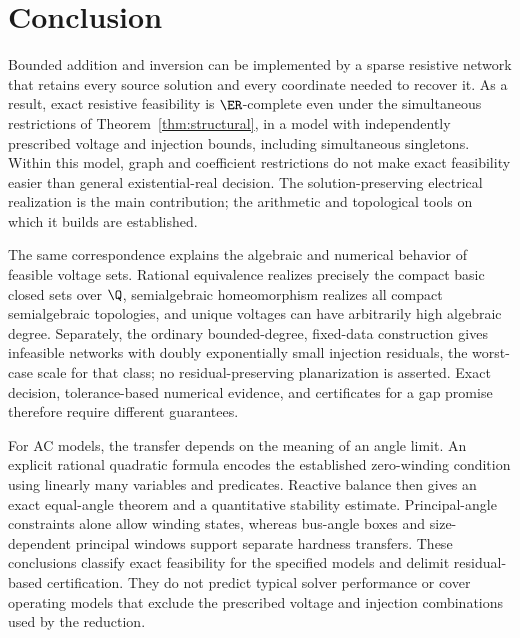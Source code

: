 \section{Conclusion}
\label{sec:conclusion}

Bounded addition and inversion can be implemented by a sparse resistive
network that retains every source solution and every coordinate needed to
recover it. As a result, exact resistive feasibility is $\ER$-complete even
under the simultaneous restrictions of Theorem~\ref{thm:structural}, in a
model with independently prescribed voltage and injection bounds, including
simultaneous singletons. Within this model, graph and coefficient
restrictions do not make exact feasibility easier than general
existential-real decision. The solution-preserving electrical realization
is the main contribution; the arithmetic and topological tools on which it
builds are established.

The same correspondence explains the algebraic and numerical behavior of
feasible voltage sets. Rational equivalence realizes precisely the compact
basic closed sets over $\Q$, semialgebraic homeomorphism realizes all
compact semialgebraic topologies, and unique voltages can have arbitrarily
high algebraic degree. Separately, the ordinary bounded-degree, fixed-data
construction gives infeasible networks with doubly exponentially small
injection residuals, the worst-case scale for that class; no
residual-preserving planarization is asserted. Exact decision,
tolerance-based numerical evidence, and certificates for a gap promise
therefore require different guarantees.

For AC models, the transfer depends on the meaning of an angle limit. An
explicit rational quadratic formula encodes the established zero-winding
condition using linearly many variables and predicates. Reactive balance then gives an exact equal-angle
theorem and a quantitative stability estimate. Principal-angle constraints
alone allow winding states, whereas bus-angle boxes and size-dependent
principal windows support separate hardness transfers. These conclusions
classify exact feasibility for the specified models and delimit
residual-based certification. They do not predict typical solver
performance or cover operating models that exclude the prescribed voltage
and injection combinations used by the reduction.
